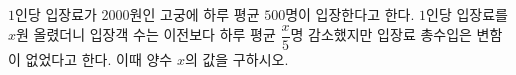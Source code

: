 $1$인당 입장료가 $2000$원인 고궁에 하루 평균 $500$명이 입장한다고 한다. $1$인당 입장료를 $x$원 올렸더니 입장객 수는 이전보다 하루 평균 $\dfrac{x}{5}$명 감소했지만 입장료 총수입은 변함이 없었다고 한다. 이때 양수 $x$의 값을 구하시오.
